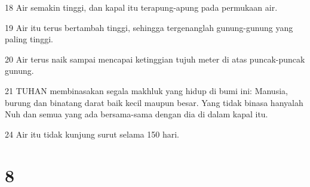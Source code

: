 \par 18 Air semakin tinggi, dan kapal itu terapung-apung pada permukaan air.
\par 19 Air itu terus bertambah tinggi, sehingga tergenanglah gunung-gunung yang paling tinggi.
\par 20 Air terus naik sampai mencapai ketinggian tujuh meter di atas puncak-puncak gunung.
\par 21 TUHAN membinasakan segala makhluk yang hidup di bumi ini: Manusia, burung dan binatang darat baik kecil maupun besar. Yang tidak binasa hanyalah Nuh dan semua yang ada bersama-sama dengan dia di dalam kapal itu.
\par 24 Air itu tidak kunjung surut selama 150 hari.

\chapter{8}


